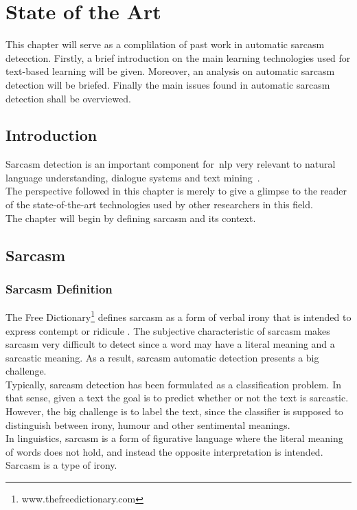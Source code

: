 \chapter{State of the Art}
\label{chap:enabling_technologies}
This chapter will serve as a complilation of past work in automatic sarcasm detecction.
Firstly, a brief introduction on the main learning technologies used for text-based learning will be given. Moreover, an analysis on automatic sarcasm detection will be briefed. Finally the main issues found in automatic sarcasm detection shall be overviewed.

\section{Introduction}
Sarcasm detection is an important component for~\ac{nlp} very relevant to natural language understanding, dialogue systems and text mining~\cite{khodak2017large}.\\ The perspective followed in this chapter is merely to give a glimpse to the reader of the state-of-the-art technologies used by other researchers in this field. \\
The chapter will begin by defining sarcasm and its context. 
\section{Sarcasm} 
\subsection{Sarcasm Definition~\cite{joshi2017automatic}}
The Free Dictionary\footnote{www.thefreedictionary.com} defines sarcasm as a form of verbal irony that is intended to express contempt or ridicule . The subjective characteristic of sarcasm makes sarcasm very difficult to detect since a word may have a literal meaning and a sarcastic meaning. As a result, sarcasm automatic detection presents a big challenge. \\
Typically, sarcasm detection has been formulated as a classification problem. In that sense, given a text the goal is to predict whether or not the text is sarcastic. However, the big challenge is to label the text, since the classifier is supposed to distinguish between irony,  humour and other sentimental meanings.\\
In linguistics, sarcasm is a form of figurative language where the literal meaning of words does not hold, and instead the opposite interpretation is intended. Sarcasm is a type of irony. 


